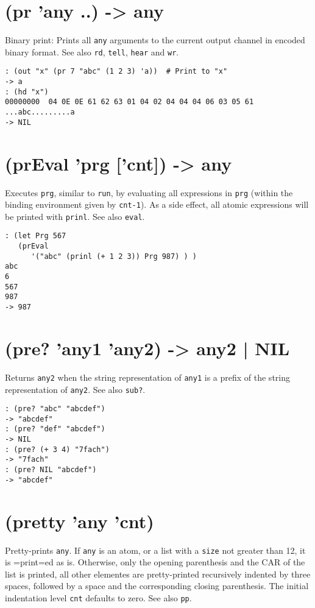 {{{{{{{ 
\section{(pr 'any ..) -> any}
\label{sec-8-1-16-25}


Binary print: Prints all \texttt{any} arguments to the current output channel
in encoded binary format. See also \texttt{rd}, \texttt{tell}, \texttt{hear} and \texttt{wr}.


\begin{verbatim}
: (out "x" (pr 7 "abc" (1 2 3) 'a))  # Print to "x"
-> a
: (hd "x")
00000000  04 0E 0E 61 62 63 01 04 02 04 04 04 06 03 05 61  ...abc.........a
-> NIL
\end{verbatim}

 
\section{(prEval 'prg ['cnt]) -> any}
\label{sec-8-1-16-26}


Executes \texttt{prg}, similar to \texttt{run}, by evaluating all expressions in \texttt{prg}
(within the binding environment given by \texttt{cnt-1}). As a side effect, all
atomic expressions will be printed with \texttt{prinl}. See also \texttt{eval}.


\begin{verbatim}
: (let Prg 567
   (prEval
      '("abc" (prinl (+ 1 2 3)) Prg 987) ) )
abc
6
567
987
-> 987
\end{verbatim}

 
\section{(pre? 'any1 'any2) -> any2 | NIL}
\label{sec-8-1-16-27}


Returns \texttt{any2} when the string representation of \texttt{any1} is a prefix of
the string representation of \texttt{any2}. See also \texttt{sub?}.


\begin{verbatim}
: (pre? "abc" "abcdef")
-> "abcdef"
: (pre? "def" "abcdef")
-> NIL
: (pre? (+ 3 4) "7fach")
-> "7fach"
: (pre? NIL "abcdef")
-> "abcdef"
\end{verbatim}

 
\section{(pretty 'any 'cnt)}
\label{sec-8-1-16-28}


Pretty-prints \texttt{any}. If \texttt{any} is an atom, or a list with a \texttt{size} not
greater than 12, it is =print=ed as is. Otherwise, only the opening
parenthesis and the CAR of the list is printed, all other elementes are
pretty-printed recursively indented by three spaces, followed by a space
and the corresponding closing parenthesis. The initial indentation level
\texttt{cnt} defaults to zero. See also \texttt{pp}.


}}}}}}}
